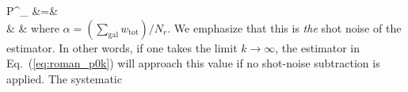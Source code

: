                                                                                                                                                                                                                                                                         \beqa \label{eq:ourshot}
                                                                                                                                                                                                                                                                        P^_ &=& \nonumber  \\ & & 
                                                                                                                                                                                                                                                                        \eeqa
                                                                                                                                                                                                                                                                        where $\alpha = (\sum_\mathrm{gal} w_\mathrm{tot} )/N_r$. 
                                                                                                                                                                                                                                                                        We emphasize that this is {\em the} shot noise of the estimator. 
                                                                                                                                                                                                                                                                        In other words, if one takes the limit $k \to \infty$, the 
                                                                                                                                                                                                                                                                        estimator in Eq.~(\ref{eq:roman_p0k}) will approach this 
                                                                                                                                                                                                                                                                        value if no shot-noise subtraction is applied. The systematic 
